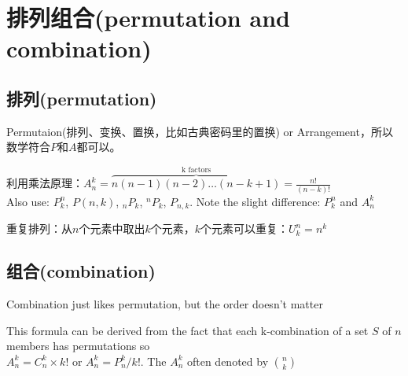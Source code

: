 \documentclass[../main.tex]{subfiles}
\begin{document}
\clearpage
\section{排列组合(permutation and combination)}

\subsection{排列(permutation)}
Permutaion(排列、变换、置换，比如古典密码里的置换) or Arrangement，所以数学符合$P$和$A$都可以。

利用乘法原理：$A_{n}^{k}=\overbrace{n(n-1)(n-2)\ldots (n-k+1)}^{\text{k factors}}=\frac{n!}{(n-k)!}$\\
Also use:  $P^{n}_{k}$, $P(n,k)$, $_{n}P_{k}$, $^{n}P_{k}$, $P_{n,k}$. Note the slight difference: $P^{n}_{k}$ and $A_{n}^{k}$

重复排列：从$n$个元素中取出$k$个元素，$k$个元素可以重复：$U^{n}_{k}=n^{k}$

\subsection{组合(combination)}
Combination just likes permutation, but the order doesn't matter

This formula can be derived from the fact that each k-combination of a set $S$ of $n$ members has permutations so\\
$A_{n}^{k}=C_{n}^{k}\times k!$ or $A_{n}^{k}=P_{n}^{k}/k!$. The $A_{n}^{k}$ often denoted by $\binom{n}{k}$

\clearpage
\end{document}
